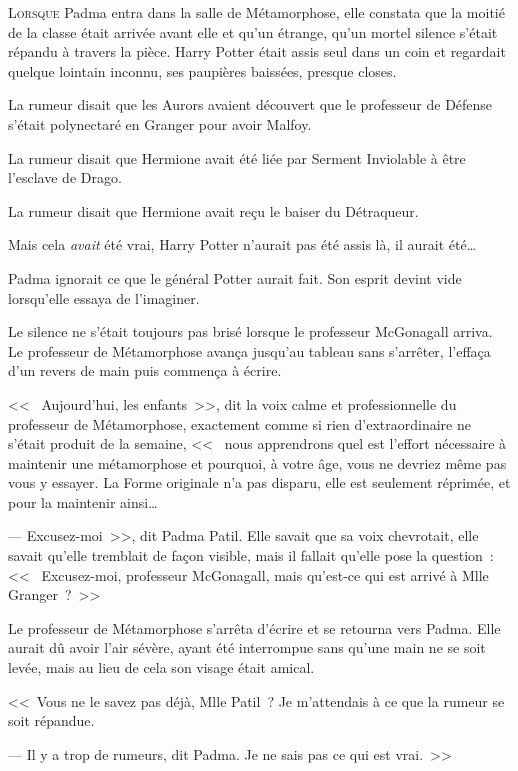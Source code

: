 
\lettrine{L}{orsque}  Padma entra dans la salle de Métamorphose, elle constata que la moitié de la classe était arrivée avant elle et qu'un étrange, qu'un mortel silence s'était répandu à travers la pièce. Harry Potter était assis seul dans un coin et regardait quelque lointain inconnu, ses paupières baissées, presque closes.

La rumeur disait que les Aurors avaient découvert que le professeur de Défense s'était polynectaré en Granger pour avoir Malfoy.

La rumeur disait que Hermione avait été liée par Serment Inviolable à être l'esclave de Drago.

La rumeur disait que Hermione avait reçu le baiser du Détraqueur.

Mais cela \emph{avait} été vrai, Harry Potter n'aurait pas été assis là, il aurait été…

Padma ignorait ce que le général Potter aurait fait. Son esprit devint vide lorsqu'elle essaya de l'imaginer.

Le silence ne s'était toujours pas brisé lorsque le professeur McGonagall arriva. Le professeur de Métamorphose avança jusqu'au tableau sans s'arrêter, l'effaça d'un revers de main puis commença à écrire.

<<~ Aujourd'hui, les enfants~>>, dit la voix calme et professionnelle du professeur de Métamorphose, exactement comme si rien d'extraordinaire ne s'était produit de la semaine, <<~ nous apprendrons quel est l'effort nécessaire à maintenir une métamorphose et pourquoi, à votre âge, vous ne devriez même pas vous y essayer. La Forme originale n'a pas disparu, elle est seulement réprimée, et pour la maintenir ainsi… 

---  Excusez-moi~>>, dit Padma Patil. Elle savait que sa voix chevrotait, elle savait qu'elle tremblait de façon visible, mais il fallait qu'elle pose la question~: <<~ Excusez-moi, professeur McGonagall, mais qu'est-ce qui est arrivé à Mlle Granger~?~>>

Le professeur de Métamorphose s'arrêta d'écrire et se retourna vers Padma. Elle aurait dû avoir l'air sévère, ayant été interrompue sans qu'une main ne se soit levée, mais au lieu de cela son visage était amical.

<<~Vous ne le savez pas déjà, Mlle Patil~? Je m'attendais à ce que la rumeur se soit répandue. 

---  Il y a trop de rumeurs, dit Padma. Je ne sais pas ce qui est vrai.~>>


